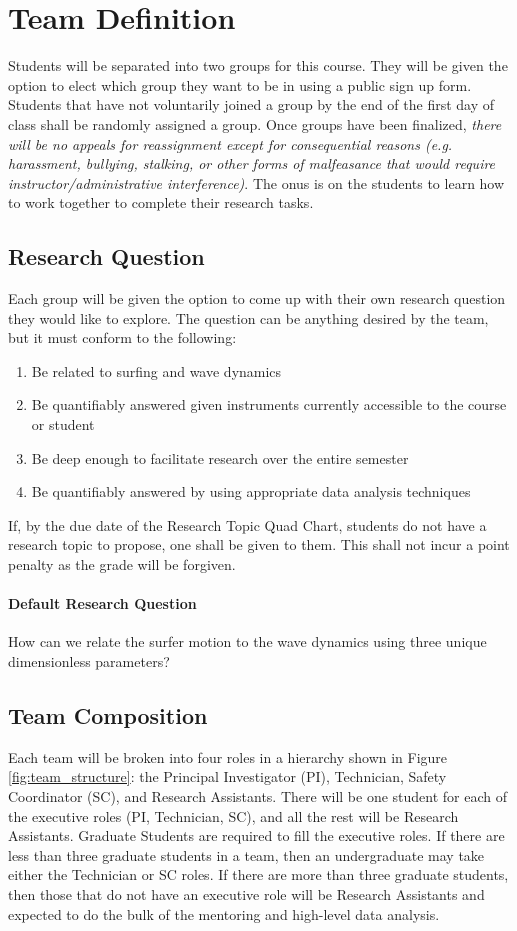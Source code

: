 \documentclass[
	letterpaper, %
	fontsize=10pt, %
	twoside=true, %
	numbers=noenddot, %
]{kaobook}
\begin{document}
\section*{Team Definition} 
Students will be separated into two groups for this course.
They will be given the option to elect which group they want to be in using a public sign up form.
Students that have not voluntarily joined a group by the end of the first day of class shall be randomly assigned a group.
Once groups have been finalized, \emph{there will be no appeals for reassignment except for consequential reasons (e.g. harassment, bullying, stalking, or other forms of malfeasance that would require instructor/administrative interference)}.
The onus is on the students to learn how to work together to complete their research tasks.

\subsection*{Research Question} \label{ssec:research_question}
Each group will be given the option to come up with their own research question they would like to explore.
The question can be anything desired by the team, but it must conform to the following:
\begin{enumerate}
    \item Be related to surfing and wave dynamics
    \item Be quantifiably answered given instruments currently accessible to the course or student
    \item Be deep enough to facilitate research over the entire semester
    \item Be quantifiably answered by using appropriate data analysis techniques
\end{enumerate}
If, by the due date of the Research Topic Quad Chart, students do not have a research topic to propose, one shall be given to them. 
This shall not incur a point penalty as the grade will be forgiven.

\paragraph*{Default Research Question} How can we relate the surfer motion to the wave dynamics using three unique dimensionless parameters?

\subsection*{Team Composition} \label{ssec:team_comp}
Each team will be broken into four roles in a hierarchy shown in Figure \ref{fig:team_structure}: the Principal Investigator (PI), Technician, Safety Coordinator (SC), and Research Assistants.
There will be one student for each of the executive roles (PI, Technician, SC), and all the rest will be Research Assistants.
Graduate Students are required to fill the executive roles.
If there are less than three graduate students in a team, then an undergraduate may take either the Technician or SC roles.
If there are more than three graduate students, then those that do not have an executive role will be Research Assistants and expected to do the bulk of the mentoring and high-level data analysis.
\end{document}
